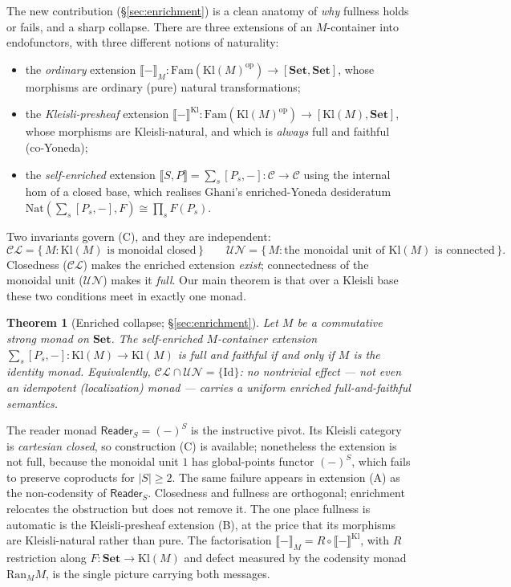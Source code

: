 \documentclass[11pt]{amsart}
\theoremstyle{plain}
\newtheorem{theorem}{Theorem}[section]
\theoremstyle{definition}
\theoremstyle{remark}
\newcommand{\Set}{\mathbf{Set}}
\newcommand{\Fam}{\mathrm{Fam}}
\newcommand{\Kl}{\mathrm{Kl}}
\newcommand{\Nat}{\mathrm{Nat}}
\newcommand{\Ran}{\mathrm{Ran}}
\newcommand{\op}{\mathrm{op}}
\newcommand{\ext}[1]{\llbracket #1 \rrbracket}
\newcommand{\extM}[1]{\llbracket #1 \rrbracket_{M}}
\newcommand{\extKl}[1]{\llbracket #1 \rrbracket^{\Kl}}
\newcommand{\Id}{\mathrm{Id}}
\newcommand{\Reader}{\mathsf{Reader}}
\newcommand{\C}{\mathcal{C}}
\newcommand{\CL}{\mathcal{CL}}
\newcommand{\UN}{\mathcal{UN}}
\begin{document}
The new contribution (\S\ref{sec:enrichment}) is a clean anatomy of \emph{why} fullness holds or
fails, and a sharp collapse. There are three extensions of an $M$-container into endofunctors, with
three different notions of naturality:
\begin{itemize}[leftmargin=1.6em]
  \item[(A)] the \emph{ordinary} extension $\extM{-}\colon \Fam(\Kl(M)^{\op}) \to [\Set,\Set]$, whose
    morphisms are ordinary (pure) natural transformations;
  \item[(B)] the \emph{Kleisli-presheaf} extension $\extKl{-}\colon \Fam(\Kl(M)^{\op}) \to [\Kl(M),\Set]$,
    whose morphisms are Kleisli-natural, and which is \emph{always} full and faithful (co-Yoneda);
  \item[(C)] the \emph{self-enriched} extension $\ext{S,P}=\sum_s [P_s,-]\colon \C\to\C$ using the
    internal hom of a closed base, which realises Ghani's enriched-Yoneda desideratum
    $\Nat(\sum_s[P_s,-],F)\cong\prod_s F(P_s)$.
\end{itemize}
Two invariants govern (C), and they are independent:
\[
  \CL = \{\,M : \Kl(M)\text{ is monoidal closed}\,\}
  \qquad
  \UN = \{\,M : \text{the monoidal unit of }\Kl(M)\text{ is connected}\,\}.
\]
Closedness ($\CL$) makes the enriched extension \emph{exist}; connectedness of the monoidal unit
($\UN$) makes it \emph{full}. Our main theorem is that over a Kleisli base these two conditions meet in
exactly one monad.

\begin{theorem}[Enriched collapse; \S\ref{sec:enrichment}]\label{thm:main-intro}
Let $M$ be a commutative strong monad on $\Set$. The self-enriched $M$-container extension
$\sum_s[P_s,-]\colon\Kl(M)\to\Kl(M)$ is full and faithful if and only if $M$ is the identity monad.
Equivalently, $\CL\cap\UN=\{\Id\}$: no nontrivial effect --- not even an idempotent (localization)
monad --- carries a uniform enriched full-and-faithful semantics.
\end{theorem}

The reader monad $\Reader_S = (-)^S$ is the instructive pivot. Its Kleisli category is
\emph{cartesian closed}, so construction (C) is available; nonetheless the extension is not full,
because the monoidal unit $1$ has global-points functor $(-)^S$, which fails to preserve coproducts for
$|S|\ge 2$. The same failure appears in extension (A) as the non-codensity of $\Reader_S$. Closedness
and fullness are orthogonal; enrichment relocates the obstruction but does not remove it. The one
place fullness is automatic is the Kleisli-presheaf extension (B), at the price that its morphisms are
Kleisli-natural rather than pure. The factorisation $\extM{-}=R\circ\extKl{-}$, with $R$ restriction
along $F\colon\Set\to\Kl(M)$ and defect measured by the codensity monad $\Ran_M M$, is the single
picture carrying both messages.
\end{document}
